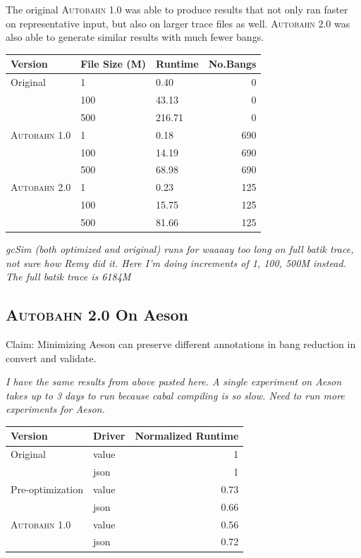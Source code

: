 \documentclass[format=sigplan, review=true]{acmart}
\newcommand{\Ao}[0]{\textsc{Autobahn 1.0}}
\newcommand{\At}[0]{\textsc{Autobahn 2.0}}
\begin{document}
The original \Ao{} was able to produce results that not only ran faster on representative input, but also on larger trace files as well. \At{} was also able to generate similar results with much fewer bangs. 

\begin{tabular}{lllr}
\hline
Version   & File Size (M) & Runtime & No.Bangs \\
\hline
Original      & 1   &   0.40	 & 0   \\
          & 100        & 43.13      & 0 \\
       & 500     &  216.71 & 0 \\
\Ao{}       & 1     & 0.18    &  690\\
          & 100        & 14.19 &  690\\
                 & 500        & 68.98	& 690\\
\At{}      & 1   &  0.23 & 125    \\
          & 100        & 15.75 & 125      \\
       & 500    & 81.66 & 125    \\

\hline
\end{tabular}

\textit{gcSim (both optimized and original) runs for waaaay too long on full batik trace, not sure how Remy did it. Here I'm doing increments of 1, 100, 500M instead. The full batik trace is 6184M}
 
\subsection{\At{} On Aeson}
 
Claim: Minimizing Aeson can preserve different annotations in bang reduction in convert and validate.

\textit{I have the same results from above pasted here. A single experiment on Aeson takes up to 3 days to run because cabal compiling is so slow. Need to run more experiments for Aeson.}

\begin{tabular}{llr}
\hline
Version   & Driver & Normalized Runtime \\
\hline
Original      & value   & 1     \\
          & json        & 1      \\
Pre-optimization       & value     & 0.73     \\
          & json        & 0.66	\\
\Ao{}       & value     & 0.56      \\
          & json        & 0.72	\\

\hline
\end{tabular}
\end{document}
